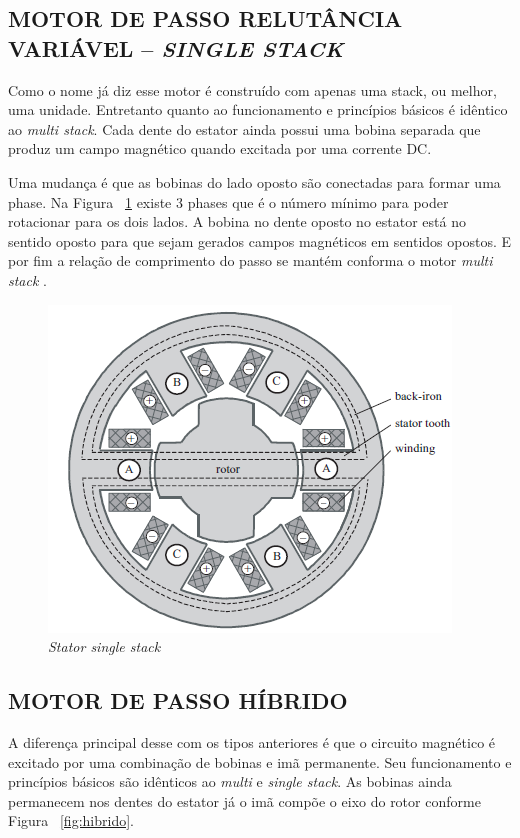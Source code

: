 \subsection{MOTOR DE PASSO RELUTÂNCIA VARIÁVEL – \emph{SINGLE STACK}}
Como o nome já diz esse motor é construído com apenas uma stack, ou melhor, uma unidade. Entretanto quanto ao funcionamento e princípios básicos é idêntico ao \emph{multi stack}. Cada dente do estator ainda possui uma bobina separada que produz um campo magnético quando excitada por uma corrente DC.

Uma mudança é que as bobinas do lado oposto são conectadas para formar uma phase. Na Figura ~\ref{fig:singlestack} existe 3 phases que é o número mínimo para poder rotacionar para os dois lados. A bobina no dente oposto no estator está no sentido oposto para que sejam gerados campos magnéticos em sentidos opostos. E por fim a relação de comprimento do passo se mantém conforma o motor \emph{multi stack} \cite{acarnley2002stepping}.

\begin{figure}[htp]
	\centering
	\includegraphics[scale=1]{images/single_stack.png}
	\caption{\emph{Stator single stack}}	
	\label{fig:singlestack}	
\end{figure}

\subsection{MOTOR DE PASSO HÍBRIDO}
A diferença principal desse com os tipos anteriores é que o circuito magnético é excitado por uma combinação de bobinas e imã permanente. Seu funcionamento e princípios básicos são idênticos ao \emph{multi} e \emph{single stack}. As bobinas ainda permanecem nos dentes do estator já o imã compõe o eixo do rotor conforme Figura ~\ref{fig:hibrido}.

